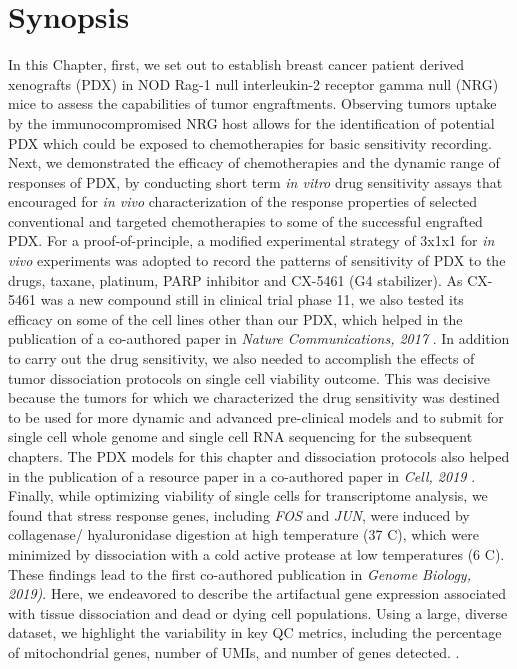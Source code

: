 \section{Synopsis}
 In this Chapter, first, we set out to establish  breast cancer patient derived xenografts (PDX) in NOD Rag-1 null interleukin-2 receptor gamma null (NRG) mice to assess the capabilities of tumor  engraftments. Observing tumors uptake by the immunocompromised NRG host allows 
 for the identification of potential PDX which could be exposed to chemotherapies for basic sensitivity recording. Next, we demonstrated the efficacy of chemotherapies and the dynamic range of responses of PDX, by conducting short term \textit{in vitro} drug sensitivity assays that encouraged for \textit{in vivo} characterization of the response properties of selected conventional and targeted chemotherapies to some of the successful engrafted  PDX.  For a proof-of-principle, a modified experimental strategy of 3x1x1 for \textit{ in vivo} experiments was adopted to record the patterns of sensitivity of PDX to the drugs, taxane, platinum, PARP inhibitor and CX-5461 (G4 stabilizer). As CX-5461 was a new compound still in clinical trial phase 11, we also tested its efficacy on some of the cell lines other than our PDX, which helped in the publication of a co-authored paper in \textit{Nature Communications, 2017} \cite{xu2017cx}. In addition to carry out the drug sensitivity, we also needed to accomplish the effects of  tumor dissociation protocols on single cell viability outcome. This was decisive because the tumors for which we characterized the drug sensitivity was destined to be used for more dynamic and advanced pre-clinical models and to submit for single cell whole genome and single cell RNA sequencing for the subsequent chapters. The PDX models for this chapter and dissociation protocols also helped in the publication of a resource paper in a co-authored paper in \textit {Cell, 2019} \cite{laks2019clonal}. Finally, while optimizing viability of single cells for transcriptome analysis, we found that stress response genes, including \textit{FOS} and \textit{JUN}, were induced by collagenase/ hyaluronidase digestion at high temperature (37 \textdegree C), which were minimized by dissociation with a cold active protease at low temperatures (6 \textdegree C). These findings lead to the first co-authored publication in \textit {Genome Biology, 2019)}. Here, we endeavored to describe the artifactual gene expression associated with tissue dissociation and dead or dying cell populations. Using a large, diverse dataset, we highlight the variability in key QC metrics, including the percentage of mitochondrial genes, number of UMIs, and number of genes detected. \cite{o2019dissociation}.
 
